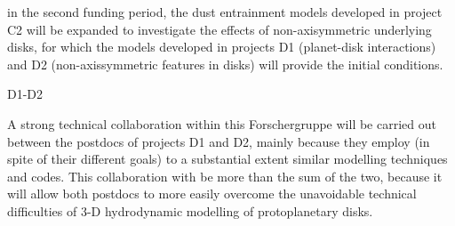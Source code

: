 \documentclass[10pt,fleqn,twoside,a4paper]{article}
\begin{document}
in the second funding period, the dust entrainment models developed in
project C2 will be expanded to investigate the effects of
non-axisymmetric underlying disks, for which the models developed in
projects D1 (planet-disk interactions) and D2 (non-axissymmetric
features in disks) will provide the initial conditions.  \\
\begin{Emphasize}  D1-D2 \end{Emphasize} A strong technical 
  collaboration within this Forschergruppe will be carried
  out between the postdocs of projects D1 and D2, mainly because
  they employ (in spite of their different goals) to a substantial
  extent similar modelling techniques and codes. This
  collaboration with be more than the sum of the two, because it will
  allow both postdocs to more easily overcome the unavoidable technical
  difficulties of 3-D hydrodynamic modelling of protoplanetary disks.
% 
\\
\end{document}
